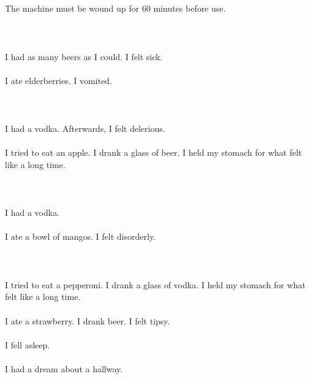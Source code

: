 \documentclass{article}
\begin{document}
    \section{}
    The machine must be wound up for 60 minutes before use.\\\\ 
    \newpage
    
    \section{}
    I had as many beers as I could. I felt sick.\\\\I ate elderberries. I vomited.\\\\ 
    \newpage
    
    \section{}
    I had a vodka. Afterwards, I felt delerious.\\\\I tried to eat an apple. I drank a glass of beer. I held my stomach for what felt like a long time.\\\\ 
    \newpage
    
    \section{}
    I had a vodka.\\\\I ate a bowl of mangos. I felt disorderly.\\\\ 
    \newpage
    
    \section{}
    I tried to eat a pepperoni. I drank a glass of vodka. I held my stomach for what felt like a long time.\\\\I ate a strawberry. I drank beer. I felt tipsy.\\\\I fell asleep.\\\\I had a dream about a hallway.\\\\ 
    \newpage
    
\end{document}
